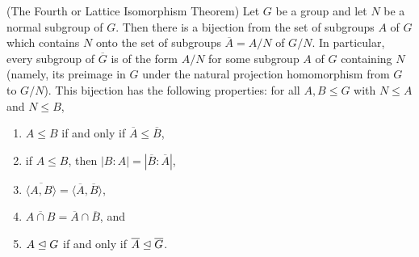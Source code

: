 \documentclass[../main]{subfiles}
\begin{document}
  
  \begin{thm}
   (The Fourth or Lattice Isomorphism Theorem) Let $G$ be a group and let $N$ be a normal subgroup of $G$. Then there is a bijection from the set of subgroups $A$ of $G$ which contains $N$ onto the set of subgroups $\overline{A} = A/N$ of $G/N$. In particular, every subgroup of $\overline{G}$ is of the form $A/N$ for some subgroup $A$ of $G$ containing $N$ (namely, its preimage in $G$ under the natural projection homomorphism from $G$ to $G/N$). This bijection has the following properties: for all $A,B\leq G$ with $N\leq A$ and $N\leq B$,
   \begin{enumerate}
    \item $A\leq B$ if and only if $\overline{A} \leq \overline{B}$,
    \item if $A\leq B$, then $|B:A| = |\overline{B}:\overline{A}|$,
    \item $\overline{\langle A,B \rangle} = \langle \overline{A},\overline{B} \rangle$,
    \item $\overline{A\cap B} = \overline{A} \cap \overline{B}$, and 
    \item $A \trianglelefteq G$ if and only if $\overline{A} \trianglelefteq \overline{G}$.
   \end{enumerate}
  \end{thm}




  
  
  
  
  
  
  
  
  
  
  
  
  
  
  
  
  



  
\end{document}
